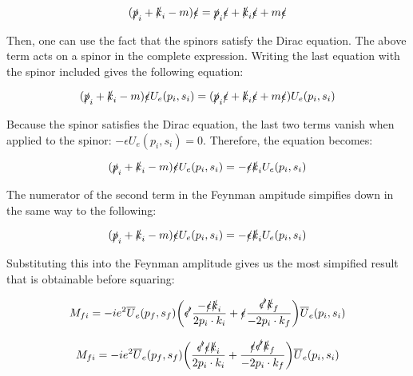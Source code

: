 \documentclass[a4]{article}
\begin{document}
    \begin{equation}
        (\slashed{p}_i + \slashed{k}_i - m) \slashed{\epsilon} = \slashed{p}_i \slashed{\epsilon} + \slashed{k}_i \slashed{\epsilon} + m \slashed{\epsilon}
    \end{equation}

    Then, one can use the fact that the spinors satisfy the Dirac equation. The above term acts on a spinor in the complete expression. Writing the last equation with the spinor included gives the
    following equation:

    \begin{equation}
        (\slashed{p}_i + \slashed{k}_i - m) \slashed{\epsilon} U_e (p_i, s_i) = (\slashed{p}_i \slashed{\epsilon} + \slashed{k}_i \slashed{\epsilon} + m \slashed{\epsilon}) U_e (p_i, s_i)
    \end{equation}

    Because the spinor satisfies the Dirac equation, the last two terms vanish when applied to the spinor: $- \epsilon U_e (p_i, s_i) = 0$. Therefore, the equation becomes:

    \begin{equation}
        (\slashed{p}_i + \slashed{k}_i - m) \slashed{\epsilon} U_e (p_i, s_i) = - \slashed{\epsilon} \slashed{k}_i U_e (p_i, s_i)
    \end{equation}

    The numerator of the second term in the Feynman ampitude simpifies down in the same way to the following:

    \begin{equation}
        (\slashed{p}_i + \slashed{k}_i - m) \slashed{\epsilon} U_e (p_i, s_i) = - \slashed{\epsilon} \slashed{k}_i U_e (p_i, s_i)
    \end{equation}

    Substituting this into the Feynman amplitude gives us the most simpified result that is obtainable before squaring:

    \begin{equation}
        M_{fi} = - i e^2 \overline{U}_e (p_f, s_f) \bigg( \slashed{\epsilon'} \frac{- \slashed{\epsilon} \slashed{k}_i}{2 p_i \cdot k_i} + \slashed{\epsilon} \frac{\slashed{\epsilon'} \slashed{k}_f}{- 2 p_i \cdot k_f} \bigg) \overline{U}_e (p_i, s_i)
    \end{equation}

    \begin{equation}
        M_{fi} = - i e^2 \overline{U}_e (p_f, s_f) \bigg(\frac{\slashed{\epsilon'} \slashed{\epsilon} \slashed{k}_i}{2 p_i \cdot k_i} + \frac{\slashed{\epsilon} \slashed{\epsilon'} \slashed{k}_f}{- 2 p_i \cdot k_f} \bigg) \overline{U}_e (p_i, s_i)
    \end{equation}
\end{document}
